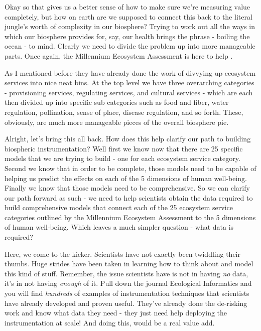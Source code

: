 \documentclass[11pt,a5paper]{book}
\begin{document}
Okay so that gives us a better sense of how to make sure we're measuring value completely, but how on earth are we supposed to connect this back to the literal jungle's worth of complexity in our biosphere? Trying to work out all the ways in which our biosphere provides for, say, our health brings the phrase - boiling the ocean - to mind. Clearly we need to divide the problem up into more manageable parts. Once again, the Millennium Ecosystem Assessment is here to help \cite{mas}. 

As I mentioned before they have already done the work of divvying up ecosystem services into nice neat bins. At the top level we have three overarching categories - provisioning services, regulating services, and cultural services - which are each then divided up into specific sub categories such as food and fiber, water regulation, pollination, sense of place, disease regulation, and so forth. These, obviously, are much more manageable pieces of the overall biosphere pie.
\newline

Alright, let's bring this all back. How does this help clarify our path to building biospheric instrumentation? Well first we know now that there are 25 specific models that we are trying to build - one for each ecosystem service category. Second we know that in order to be complete, those models need to be capable of helping us predict the effects on each of the 5 dimensions of human well-being. Finally we know that those models need to be comprehensive. So we can clarify our path forward as such - we need to help scientists obtain the data required to build comprehensive models that connect each of the 25 ecosystem service categories outlined by the Millennium Ecosystem Assessment to the 5 dimensions of human well-being. Which leaves a much simpler question - what data is required?
\newline

Here, we come to the kicker. Scientists have not exactly been twiddling their thumbs. Huge strides have been taken in learning how to think about and model this kind of stuff. Remember, the issue scientists have is not in having \textit{no} data, it's in not having \textit{enough} of it. Pull down the journal Ecological Informatics and you will find \textit{hundreds} of examples of instrumentation techniques that scientists have already developed and proven useful. They've already done the de-risking work and know what data they need - they just need help deploying the instrumentation at scale! And doing this, would be a real value add. 
\end{document}
